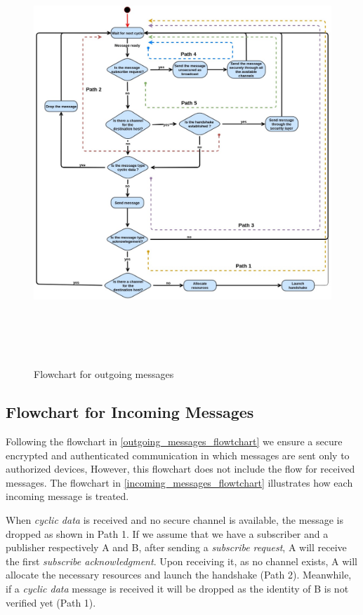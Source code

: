 \begin{figure}[p]
\centering
\includegraphics[height=16cm]{figures/design/outgoing_messages_flowtchart.jpg}
\caption{Flowchart for outgoing messages}\label{outgoing_messages_flowtchart}
\end{figure}

\newpage
\subsection{Flowchart for Incoming Messages}

Following the flowchart in \autoref{outgoing_messages_flowtchart} we ensure a secure encrypted and authenticated
communication in which messages are sent only to authorized devices, However, this flowchart does not include
the flow for received messages. The flowchart in \autoref{incoming_messages_flowtchart} illustrates how each incoming message is treated.

When \textit{cyclic data} is received and no secure channel is available, the message is dropped as shown in Path 1.
If we assume that we have a subscriber and a publisher respectively A and B, after sending a \textit{subscribe request}, A
will receive the first \textit{subscribe acknowledgment}. Upon receiving it, as no channel exists, A will allocate
the necessary resources and launch the handshake (Path 2). Meanwhile, if a \textit{cyclic data} message is received it
will be dropped as the identity of B is not verified yet (Path 1).

